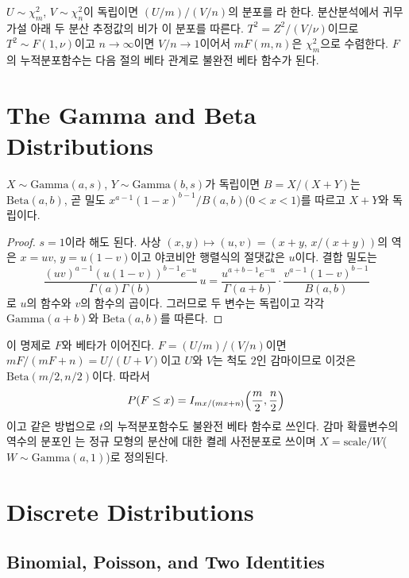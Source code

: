 $U\sim\chi^2_m$, $V\sim\chi^2_n$이 독립이면 $(U/m)/(V/n)$의 분포를 라 한다. 분산분석에서 귀무가설 아래 두 분산 추정값의 비가 이 분포를 따른다. $T^2=Z^2/(V/\nu)$이므로 $T^2\sim F(1,\nu)$이고 $n\to\infty$이면 $V/n\to1$이어서 $mF(m,n)$은 $\chi^2_m$으로 수렴한다. $F$의 누적분포함수는 다음 절의 베타 관계로 불완전 베타 함수가 된다.

\section{The Gamma and Beta Distributions}
\label{sec:gamma-beta}

\begin{proposition}
\label{prop:gamma-beta}
$X\sim\mathrm{Gamma}(a,s)$, $Y\sim\mathrm{Gamma}(b,s)$가 독립이면 $B=X/(X+Y)$는  $\mathrm{Beta}(a,b)$, 곧 밀도 $x^{a-1}(1-x)^{b-1}/B(a,b)$($0<x<1$)를 따르고 $X+Y$와 독립이다.
\end{proposition}

\begin{proof}
$s=1$이라 해도 된다. 사상 $(x,y)\mapsto(u,v)=(x+y,\,x/(x+y))$의 역은 $x=uv$, $y=u(1-v)$이고 야코비안 행렬식의 절댓값은 $u$이다. 결합 밀도는
\[
\frac{(uv)^{a-1}(u(1-v))^{b-1}e^{-u}}{\Gamma(a)\Gamma(b)}\,u=\frac{u^{a+b-1}e^{-u}}{\Gamma(a+b)}\cdot\frac{v^{a-1}(1-v)^{b-1}}{B(a,b)}
\]
로 $u$의 함수와 $v$의 함수의 곱이다. 그러므로 두 변수는 독립이고 각각 $\mathrm{Gamma}(a+b)$와 $\mathrm{Beta}(a,b)$를 따른다.
\end{proof}

이 명제로 $F$와 베타가 이어진다. $F=(U/m)/(V/n)$이면 $mF/(mF+n)=U/(U+V)$이고 $U$와 $V$는 척도 $2$인 감마이므로 이것은 $\mathrm{Beta}(m/2,n/2)$이다. 따라서
\[
P(F\le x)=I_{mx/(mx+n)}\Bigl(\frac m2,\frac n2\Bigr)
\]
이고 같은 방법으로 $t$의 누적분포함수도 불완전 베타 함수로 쓰인다. 감마 확률변수의 역수의 분포인 는 정규 모형의 분산에 대한 켤레 사전분포로 쓰이며 $X=\text{scale}/W$($W\sim\mathrm{Gamma}(a,1)$)로 정의된다.

\section{Discrete Distributions}
\label{sec:discrete-families}

\subsection{Binomial, Poisson, and Two Identities}

